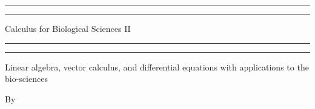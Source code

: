 


\begin{titlepage} %

	\centering %
	
	\scshape %
	
	\vspace*{\baselineskip} %
	
	
	\rule{\textwidth}{1.6pt}\vspace*{-\baselineskip}\vspace*{2pt} %
	\rule{\textwidth}{0.4pt} %
	
	\vspace{\baselineskip} %
	
	{\LARGE Calculus for Biological Sciences II} %
	
	\vspace{0.3\baselineskip} %
	
	\rule{\textwidth}{0.4pt}\vspace*{-\baselineskip}\vspace{3.2pt} %
	\rule{\textwidth}{1.6pt} %
	
	\vspace{2\baselineskip} %
	
	
	Linear algebra, vector calculus, and differential equations with applications to the bio-sciences %
	
	\vspace*{3\baselineskip} %
	
	
	By
	
	\vspace{0.5\baselineskip} %
	

\end{titlepage}
